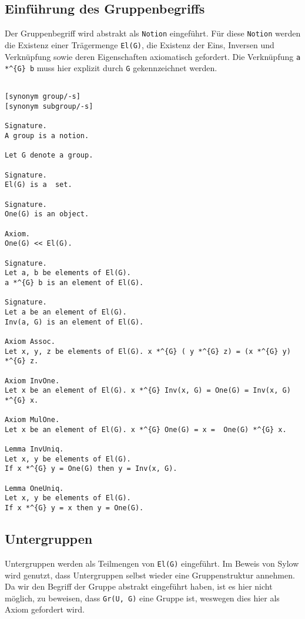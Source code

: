 \documentclass[a4paper,12pt]{scrartcl}
\begin{document}
\subsection{Einführung des Gruppenbegriffs}

Der Gruppenbegriff wird abstrakt als \verb!Notion! eingeführt.
Für diese \verb!Notion! werden die Existenz einer Trägermenge \verb!El(G)!, die Existenz der Eins, Inversen und Verknüpfung sowie deren Eigenschaften axiomatisch gefordert.
Die Verknüpfung \verb!a *^{G} b! muss hier explizit durch \verb!G! gekennzeichnet werden.

\begin{lstlisting}

[synonym group/-s]
[synonym subgroup/-s]

Signature.
A group is a notion.

Let G denote a group.

Signature.
El(G) is a  set.

Signature.
One(G) is an object.

Axiom.
One(G) << El(G).

Signature.
Let a, b be elements of El(G).
a *^{G} b is an element of El(G).

Signature.
Let a be an element of El(G).
Inv(a, G) is an element of El(G).

Axiom Assoc.
Let x, y, z be elements of El(G). x *^{G} ( y *^{G} z) = (x *^{G} y) *^{G} z. 

Axiom InvOne.
Let x be an element of El(G). x *^{G} Inv(x, G) = One(G) = Inv(x, G) *^{G} x.

Axiom MulOne.
Let x be an element of El(G). x *^{G} One(G) = x =  One(G) *^{G} x.

Lemma InvUniq.
Let x, y be elements of El(G).
If x *^{G} y = One(G) then y = Inv(x, G).

Lemma OneUniq.
Let x, y be elements of El(G).
If x *^{G} y = x then y = One(G).

\end{lstlisting}

\subsection{Untergruppen}

Untergruppen werden als Teilmengen von \verb!El(G)! eingeführt.
Im Beweis von Sylow wird genutzt, dass Untergruppen selbst wieder eine Gruppenstruktur annehmen. Da wir den Begriff der Gruppe abstrakt eingeführt haben, ist es hier nicht möglich, zu beweisen, dass \verb!Gr(U, G)! eine Gruppe ist, weswegen dies hier als Axiom gefordert wird.
\end{document}
